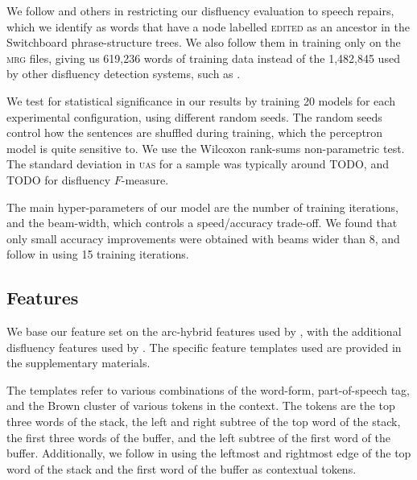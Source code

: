 \documentclass[11pt,letterpaper]{article}
\begin{document}
We follow \citet{Johnson04a} and others in restricting our disfluency evaluation
to speech repairs, which we identify as words that have a node labelled \textsc{edited}
as an ancestor in the Switchboard phrase-structure trees.  We also follow them
in training only on the \textsc{mrg} files, giving us 619,236 words of training
data instead of the 1,482,845 used by other disfluency detection systems, such
as \citet{qian:13}.

We test for statistical significance in our results by training 20 models for
each experimental configuration, using different random seeds. The random seeds
control how the sentences are shuffled during training, which the perceptron
model is quite sensitive to.  We use the Wilcoxon rank-sums non-parametric test.
The standard deviation in \textsc{uas} for a sample was typically around TODO,
and TODO for disfluency $F$-measure.

The main hyper-parameters of our model are the number of training iterations,
and the beam-width, which controls a speed/accuracy trade-off.  We found that
only small accuracy improvements were obtained with beams wider than 8, and follow
\citet{honnibal:14} in using 15 training iterations.  

\subsection{Features}

We base our feature set on the arc-hybrid features used by
\citet{goldberg:13},
with the additional disfluency features used by \citet{honnibal:14}.  The
specific feature templates used are provided in the supplementary materials.

The templates refer to various combinations of the word-form, part-of-speech tag,
and the Brown cluster \citep{brown:92} of various tokens
in the context.  The tokens are the top three words of the stack, the left and
right subtree of the top word of the stack, the first three words of the buffer,
and the left subtree of the first word of the buffer.  Additionally, we follow
\citet{honnibal:14} in using the leftmost and rightmost edge of the top word
of the stack and the first word of the buffer as contextual tokens.

\end{document}
